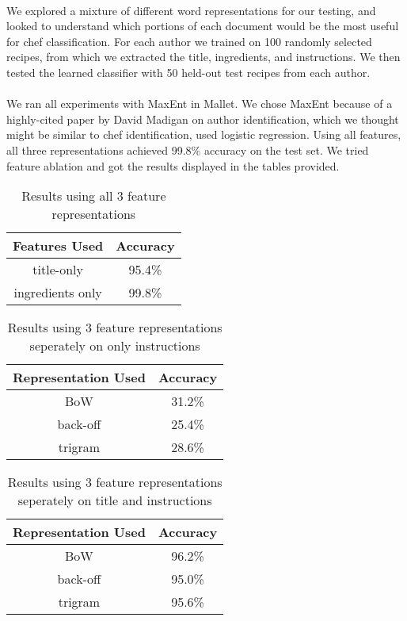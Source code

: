 \documentclass[paper=a4, fontsize=11pt]{scrartcl} %
\begin{document}
\paragraph{}
We explored a mixture of different word representations for our testing, and looked to understand which portions of each document would be the most useful for chef classification.  For each author we trained on 100 randomly selected recipes, from which we extracted the title, ingredients, and instructions.
We then tested the learned classifier with 50 held-out test recipes from each author.

\paragraph{}
We ran all experiments with MaxEnt in Mallet.  
We chose MaxEnt because of a highly-cited paper by David Madigan on author identification, which we thought might be similar to chef identification, used logistic regression.  
Using all features, all three representations achieved 99.8\% accuracy on the test set.
We tried feature ablation and got the results displayed in the tables provided.

\begin{table}[h]
\centering
\label{tab:3results}
\caption{Results using all 3 feature representations}
\begin{tabular}{|c|c|}
\hline
 Features Used & Accuracy \\ \hline \hline
title-only & 95.4\% \\  \hline
ingredients only & 99.8\% \\ \hline
\end{tabular}
\end{table}


\begin{table}[h]
\centering
\label{tab:instructions only}
\caption{Results using 3 feature representations seperately on only instructions}
\begin{tabular}{|c|c|}
\hline
 Representation Used & Accuracy \\ \hline \hline
BoW & 31.2\% \\  \hline
back-off & 25.4\% \\ \hline
trigram & 28.6\% \\ \hline
\end{tabular}
\end{table}

\begin{table}[h]
\centering
\label{tab:instructions only}
\caption{Results using 3 feature representations seperately on title and instructions}
\begin{tabular}{|c|c|}
\hline
 Representation Used & Accuracy \\ \hline \hline
BoW & 96.2\% \\  \hline
back-off & 95.0\% \\ \hline
trigram & 95.6\% \\ \hline
\end{tabular}
\end{table}
\end{document}
